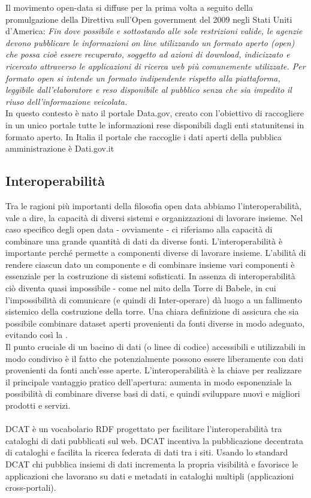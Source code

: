 \documentclass{article}
\theoremstyle{plain}
\theoremstyle{definition}
\begin{document}
Il movimento open-data si diffuse per la prima volta a seguito della promulgazione della Direttiva sull'Open government del 2009 negli Stati Uniti d'America:
\textit{Fin dove possibile e sottostando alle sole restrizioni valide, le agenzie devono pubblicare le informazioni on line utilizzando un formato aperto (open) che possa cioè essere recuperato, soggetto ad azioni di download, indicizzato e ricercato attraverso le applicazioni di ricerca web più comunemente utilizzate. Per formato open si intende un formato indipendente rispetto alla piattaforma, leggibile dall'elaboratore e reso disponibile al pubblico senza che sia impedito il riuso dell'informazione veicolata.}
\\
In questo contesto è nato il portale Data.gov, creato con l'obiettivo di raccogliere in un unico portale tutte le informazioni rese disponibili dagli enti statunitensi in formato aperto. In Italia il portale che raccoglie i dati aperti della pubblica amministrazione è Dati.gov.it
 
\subsection{Interoperabilità}
Tra le ragioni più importanti della filosofia open data abbiamo l'interoperabilità, vale a dire, la capacità di diversi sistemi e organizzazioni di lavorare insieme. Nel caso specifico degli open data - ovviamente - ci riferiamo alla capacità di combinare una grande quantità di dati da diverse fonti. L'interoperabilità è importante perché permette a componenti diverse di lavorare insieme. L'abilità di rendere ciascun dato un componente e di combinare insieme vari componenti è essenziale per la costruzione di sistemi sofisticati. In assenza di interoperabilità ciò diventa quasi impossibile - come nel mito della Torre di Babele, in cui l'impossibilità di comunicare (e quindi di Inter-operare) dà luogo a un fallimento sistemico della costruzione della torre. Una chiara definizione di  assicura che sia possibile combinare dataset aperti provenienti da fonti diverse in modo adeguato, evitando così la .
\\
Il punto cruciale di un bacino di dati (o linee di codice) accessibili e utilizzabili in modo condiviso è il fatto che potenzialmente possono essere liberamente  con dati provenienti da fonti anch'esse aperte. L'interoperabilità è la chiave per realizzare il principale vantaggio pratico dell'apertura: aumenta in modo esponenziale la possibilità di combinare diverse basi di dati, e quindi sviluppare nuovi e migliori prodotti e servizi.
\footnotemark
{}
\\
\\
DCAT è un vocabolario RDF progettato per facilitare l'interoperabilità tra cataloghi di dati pubblicati sul web. DCAT incentiva la pubblicazione decentrata di cataloghi e facilita la ricerca federata di dati tra i siti. Usando lo standard DCAT chi pubblica insiemi di dati incrementa la propria visibilità e favorisce le applicazioni che lavorano su dati e metadati in cataloghi multipli (applicazioni cross-portali).
\end{document}
